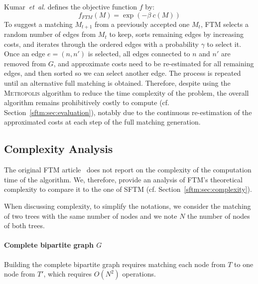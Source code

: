 Kumar~\emph{et~al.} defines the objective function $f$ by:
\begin{equation} \label{eq:objective_FTM}
	f_{FTM}(M) = \exp(-\beta\ c(M))
\end{equation}
To suggest a matching $M_{t+1}$ from a previously accepted one $M_t$, FTM selects a random number of edges from $M_t$ to keep, sorts remaining edges by increasing costs, and iterates through the ordered edges with a probability $\gamma$ to select it.
Once an edge $e = (n,n')$ is selected, all edges connected to $n$ and $n'$ are removed from $G$, and approximate costs need to be re-estimated for all remaining edges, and then sorted so we can select another edge.
The process is repeated until an alternative full matching is obtained.
Therefore, despite using the \textsc{Metropolis} algorithm to reduce the time complexity of the problem, the overall algorithm remains prohibitively costly to compute (cf. Section~\ref{sftm:sec:evaluation}), notably due to the continuous re-estimation of the approximated costs at each step of the full matching generation.

\subsection{Complexity Analysis}\label{sftm:sec:ftm_complexity}
The original FTM article~\cite{Kumar2011_FTM} does not report on the complexity of the computation time of the algorithm.
We, therefore, provide an analysis of FTM's theoretical complexity to compare it to the one of SFTM (cf. Section~\ref{sftm:sec:complexity}).

When discussing complexity, to simplify the notations, we consider the matching of two trees with the same number of nodes and we note $N$ the number of nodes of both trees.

\paragraph{Complete bipartite graph $G$}
Building the complete bipartite graph requires matching each node from $T$ to one node from $T'$, which requires $O(N^2)$ operations. 

